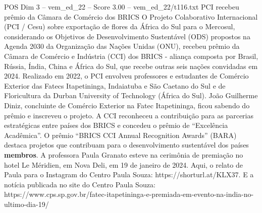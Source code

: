 \begin{textsample}{POS Dim 3 – vem\_ed\_22 – Score 3.00 – vem\_ed\_22/t116.txt}  \label{ex:f3_pos_166}
PCI recebeu prêmio da Câmara de Comércio dos BRICS O Projeto Colaborativo Internacional (PCI / Cesu) sobre exportação de flores da África do Sul para o Mercosul, considerando os Objetivos de Desenvolvimento Sustentável (ODS) propostos na Agenda 2030 da Organização das Nações Unidas (ONU), recebeu prêmio da Câmara de Comércio e Indústria (CCI) dos BRICS - aliança composta por Brasil, Rússia, Índia, China e África do Sul, que recebe outras seis nações convidadas em 2024.
Realizado em 2022, o PCI envolveu professores e estudantes de Comércio Exterior das Fatecs Itapetininga, Indaiatuba e São Caetano do Sul e de Floricultura da Durban University of Technology (África do Sul).
João Guilherme Diniz, concluinte de Comércio Exterior na Fatec Itapetininga, ficou sabendo do prêmio e inscreveu o projeto.
A CCI reconheceu a contribuição para as parcerias estratégicas entre países dos BRICS e concedeu o prêmio de “Excelência Acadêmica”.
O prêmio “BRICS CCI Annual Recognition Awards” (BARA) destaca projetos que contribuam para o desenvolvimento sustentável dos países \textbf{membros}.
A professora Paula Granato esteve na cerimônia de premiação no hotel Le Méridien, em Nova Deli, em 19 de janeiro de 2024.
Aqui, o relato de Paula para o Instagram do Centro Paula Souza: https://shorturl.at/KLX37.
E a notícia publicada no site do Centro Paula Souza: https://www.cps.sp.gov.br/fatec-itapetininga-e-premiada-em-evento-na-india-no-ultimo-dia-19/

\end{textsample}
